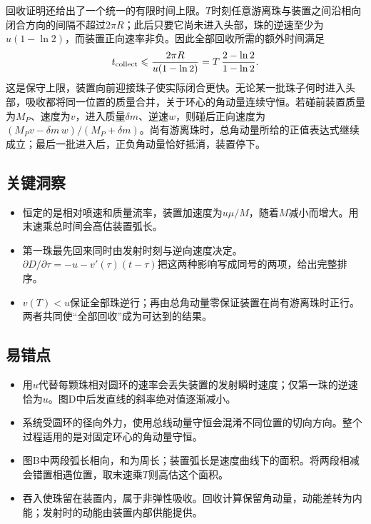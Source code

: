 \documentclass[UTF8,fontset=fandol,a4paper,11pt]{ctexart}
\begin{document}
回收证明还给出了一个统一的有限时间上限。$T$时刻任意游离珠与装置之间沿相向闭合方向的间隔不超过$2\pi R$；此后只要它尚未进入头部，珠的逆速至少为$u(1-\ln2)$，而装置正向速率非负。因此全部回收所需的额外时间满足
\[
t_{\rm collect}\leqslant\frac{2\pi R}{u(1-\ln2)}
=T\,\frac{2-\ln2}{1-\ln2}.
\]
这是保守上限，装置向前迎接珠子使实际闭合更快。无论某一批珠子何时进入头部，吸收都将同一位置的质量合并，关于环心的角动量连续守恒。若碰前装置质量为$M_P$、速度为$v$，进入质量$\delta m$、逆速$w$，则碰后正向速度为$(M_Pv-\delta m\,w)/(M_P+\delta m)$。尚有游离珠时，总角动量所给的正值表达式继续成立；最后一批进入后，正负角动量恰好抵消，装置停下。




\subsection*{关键洞察}

\begin{itemize}
\item 恒定的是相对喷速和质量流率，装置加速度为$u\mu/M$，随着$M$减小而增大。用末速乘总时间会高估装置弧长。
\item 第一珠最先回来同时由发射时刻与逆向速度决定。$\partial D/\partial\tau=-u-v'(\tau)(t-\tau)$把这两种影响写成同号的两项，给出完整排序。
\item $v(T)<u$保证全部珠逆行；再由总角动量零保证装置在尚有游离珠时正行。两者共同使“全部回收”成为可达到的结果。
\end{itemize}



\subsection*{易错点}

\begin{itemize}
\item 用$u$代替每颗珠相对圆环的速率会丢失装置的发射瞬时速度；仅第一珠的逆速恰为$u$。图D中后发直线的斜率绝对值逐渐减小。
\item 系统受圆环的径向外力，使用总线动量守恒会混淆不同位置的切向方向。整个过程适用的是对固定环心的角动量守恒。
\item 图B中两段弧长相向，和为周长；装置弧长是速度曲线下的面积。将两段相减会错置相遇位置，取末速乘$T$则高估这个面积。
\item 吞入使珠留在装置内，属于非弹性吸收。回收计算保留角动量，动能差转为内能；发射时的动能由装置内部供能提供。
\end{itemize}
\end{document}
